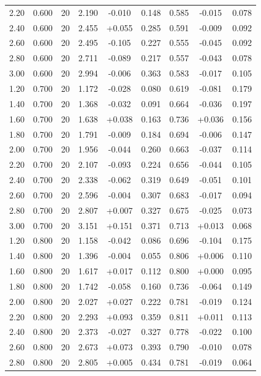 \begin{longtable}{ccccccccc}
2.20 & 0.600 & 20 & 2.190 & -0.010 & 0.148 & 0.585 & -0.015 & 0.078 \\
2.40 & 0.600 & 20 & 2.455 & +0.055 & 0.285 & 0.591 & -0.009 & 0.092 \\
2.60 & 0.600 & 20 & 2.495 & -0.105 & 0.227 & 0.555 & -0.045 & 0.092 \\
2.80 & 0.600 & 20 & 2.711 & -0.089 & 0.217 & 0.557 & -0.043 & 0.078 \\
3.00 & 0.600 & 20 & 2.994 & -0.006 & 0.363 & 0.583 & -0.017 & 0.105 \\
1.20 & 0.700 & 20 & 1.172 & -0.028 & 0.080 & 0.619 & -0.081 & 0.179 \\
1.40 & 0.700 & 20 & 1.368 & -0.032 & 0.091 & 0.664 & -0.036 & 0.197 \\
1.60 & 0.700 & 20 & 1.638 & +0.038 & 0.163 & 0.736 & +0.036 & 0.156 \\
1.80 & 0.700 & 20 & 1.791 & -0.009 & 0.184 & 0.694 & -0.006 & 0.147 \\
2.00 & 0.700 & 20 & 1.956 & -0.044 & 0.260 & 0.663 & -0.037 & 0.114 \\
2.20 & 0.700 & 20 & 2.107 & -0.093 & 0.224 & 0.656 & -0.044 & 0.105 \\
2.40 & 0.700 & 20 & 2.338 & -0.062 & 0.319 & 0.649 & -0.051 & 0.101 \\
2.60 & 0.700 & 20 & 2.596 & -0.004 & 0.307 & 0.683 & -0.017 & 0.094 \\
2.80 & 0.700 & 20 & 2.807 & +0.007 & 0.327 & 0.675 & -0.025 & 0.073 \\
3.00 & 0.700 & 20 & 3.151 & +0.151 & 0.371 & 0.713 & +0.013 & 0.068 \\
1.20 & 0.800 & 20 & 1.158 & -0.042 & 0.086 & 0.696 & -0.104 & 0.175 \\
1.40 & 0.800 & 20 & 1.396 & -0.004 & 0.055 & 0.806 & +0.006 & 0.110 \\
1.60 & 0.800 & 20 & 1.617 & +0.017 & 0.112 & 0.800 & +0.000 & 0.095 \\
1.80 & 0.800 & 20 & 1.742 & -0.058 & 0.160 & 0.736 & -0.064 & 0.149 \\
2.00 & 0.800 & 20 & 2.027 & +0.027 & 0.222 & 0.781 & -0.019 & 0.124 \\
2.20 & 0.800 & 20 & 2.293 & +0.093 & 0.359 & 0.811 & +0.011 & 0.113 \\
2.40 & 0.800 & 20 & 2.373 & -0.027 & 0.327 & 0.778 & -0.022 & 0.100 \\
2.60 & 0.800 & 20 & 2.673 & +0.073 & 0.393 & 0.790 & -0.010 & 0.078 \\
2.80 & 0.800 & 20 & 2.805 & +0.005 & 0.434 & 0.781 & -0.019 & 0.064 \\

\end{longtable}
